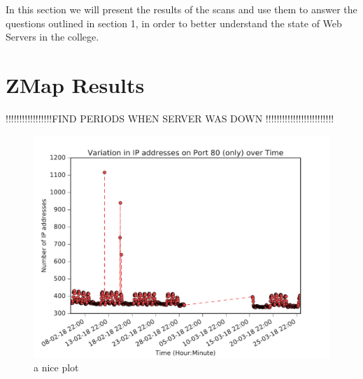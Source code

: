 \documentclass[a4wide,leqno,12pt]{report}
\begin{document}
In this section we will
present the results of the scans and use them to answer the questions outlined in section 1, in order to better understand the state of Web Servers in the college.


\section{ZMap Results} 
!!!!!!!!!!!!!!!!!FIND PERIODS WHEN SERVER WAS DOWN !!!!!!!!!!!!!!!!!!!!!!!!!

\begin{figure}[h!]
\includegraphics[scale=.5]{pdf_images/VariationInIpAddressesOnPort80OverTime}
\caption{a nice plot}
\label{fig:port80ZMap}
\end{figure}
\end{document}

